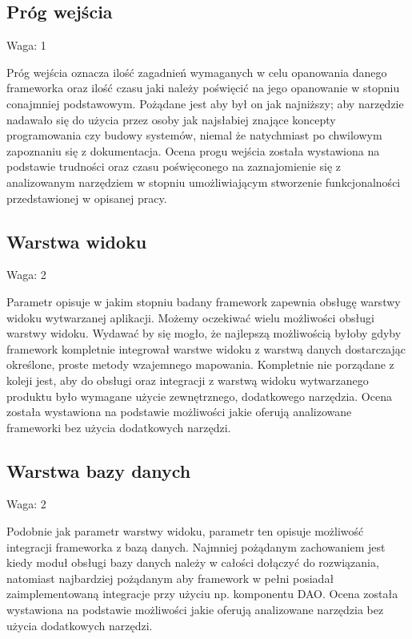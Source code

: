 \documentclass[12pt]{report}
\begin{document}
    \subsection{Próg wejścia}
      \begin{description}
        \item Waga: 1
      \end{description}
      Próg wejścia oznacza ilość zagadnień wymaganych w celu opanowania danego frameworka oraz ilość czasu jaki należy poświęcić na jego opanowanie w stopniu conajmniej podstawowym.
      Pożądane jest aby był on jak najniższy; aby narzędzie nadawało się do użycia przez osoby jak najsłabiej znające koncepty programowania czy budowy systemów, niemal że natychmiast po chwilowym zapoznaniu się z dokumentacja.
      Ocena progu wejścia została wystawiona na podstawie trudności oraz czasu poświęconego na zaznajomienie się z analizowanym narzędziem w stopniu umożliwiającym stworzenie funkcjonalności przedstawionej w opisanej pracy.

    \subsection{Warstwa widoku}
      \begin{description}
        \item Waga: 2
      \end{description}
      Parametr opisuje w jakim stopniu badany framework zapewnia obsługę warstwy widoku wytwarzanej aplikacji.
      Możemy oczekiwać wielu możliwości obsługi warstwy widoku.
      Wydawać by się mogło, że najlepszą możliwością byłoby gdyby framework kompletnie integrował warstwe widoku z warstwą danych dostarczając określone, proste metody wzajemnego mapowania.
      Kompletnie nie porządane z koleji jest, aby do obsługi oraz integracji z warstwą widoku wytwarzanego produktu było wymagane użycie zewnętrznego, dodatkowego narzędzia.
      Ocena została wystawiona na podstawie możliwości jakie oferują analizowane frameworki bez użycia dodatkowych narzędzi.

    \subsection{Warstwa bazy danych}
      \begin{description}
        \item Waga: 2
      \end{description}
      Podobnie jak parametr warstwy widoku, parametr ten opisuje możliwość integracji frameworka z bazą danych.
      Najmniej pożądanym zachowaniem jest kiedy moduł obsługi bazy danych należy w całości dołączyć do rozwiązania, natomiast najbardziej pożądanym aby framework w pełni posiadał zaimplementowaną integracje przy użyciu np. komponentu DAO.
      Ocena została wystawiona na podstawie możliwości jakie oferują analizowane narzędzia bez użycia dodatkowych narzędzi.
\end{document}
